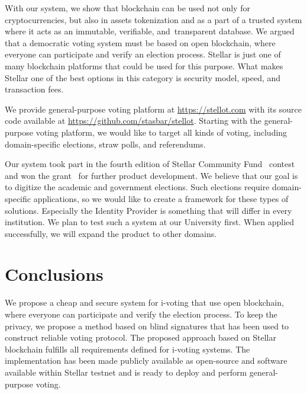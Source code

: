 \documentclass[applsci,article,accept,moreauthors,pdftex]{Definitions/mdpi}
\begin{document}
With our system, we show that blockchain can be used not only for cryptocurrencies, but also in assets tokenization and as a part of a trusted system where it acts as an immutable, verifiable, and~transparent database. We argued that a democratic voting system must be based on open blockchain, where everyone can participate and verify an election process. Stellar is just one of many blockchain platforms that could be used for this purpose. What makes Stellar one of the best options in this category is security model, speed, and transaction fees. 

We provide general-purpose voting platform at \url{https://stellot.com} with its source code available at \url{https://github.com/stasbar/stellot}.
Starting with the general-purpose voting platform, we would like to target all kinds of voting, including domain-specific elections, straw polls, and referendums. %

Our system took part in the fourth edition of Stellar Community Fund~\cite{StellarC85:online} contest and won the grant~\cite{StellarC62:online} for further product development. We believe that our goal is to digitize the academic and government elections. Such elections require domain-specific applications, so we would like to create a framework for these types of solutions. Especially the Identity Provider is something that will differ in every institution. We plan to test such a system at our University first. When applied successfully, we will expand the product to other domains.

\section{Conclusions}
We propose a cheap and secure system for i-voting that use 
open blockchain, where everyone can participate and verify the election process.
To keep the privacy, we propose a method based on blind signatures 
that has been used to construct reliable voting protocol.
The proposed approach based on Stellar blockchain fulfills all requirements defined for i-voting systems.
The implementation has been made publicly available as open-source and software available within Stellar testnet and is ready to deploy and perform general-purpose voting.
\vspace{6pt}
\end{document}
